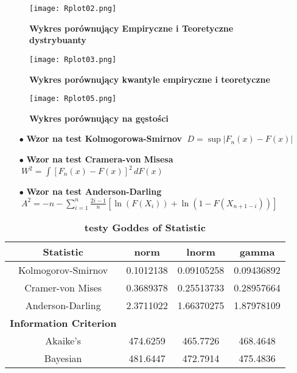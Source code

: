 \documentclass{article}
\begin{document}
\begin{figure}
    \centering
    \texttt{[image: Rplot02.png]}
    \caption{\textbf{Wykres porównujący Empiryczne i Teoretyczne dystrybuanty}}
    \label{fig:enter-label1}
\end{figure}

\begin{figure}
    \centering
    \texttt{[image: Rplot03.png]}
    \caption{\textbf{Wykres porównujący kwantyle empiryczne i teoretyczne}}
    \label{fig:enter-label2}
\end{figure}

\begin{figure}
    \centering
    \texttt{[image: Rplot05.png]}
    \caption{\textbf{Wykres porównujący na gęstości}}
    \label{fig:enter-label3}
\end{figure}
\vspace{12pt}

\begin{itemize}
    \item[$\bullet$] \textbf{Wzor na test Kolmogorowa-Smirnov $\ D = \sup|F_n(x) - F(x)|$}

    \item[$\bullet$] \textbf{Wzor na test Cramera-von Misesa $\ W^2 = \int [F_n(x) - F(x)]^2 \, dF(x)$}

    \item[$\bullet$] \textbf{Wzor na test Anderson-Darling $\ A^2 = -n - \sum_{i=1}^{n} \frac{2i-1}{n} \left[ \ln(F(X_i)) + \ln(1 - F(X_{n+1-i})) \right]$}
\end{itemize}

\vspace{12pt}

\begin{table}[htbp]
    \centering
    \caption{\textbf{testy Goddes of Statistic}}
    \begin{tabular}{|c|c|c|c|}
        \hline
        \textbf{Statistic} & \textbf{norm} & \textbf{lnorm} & \textbf{gamma} \\
        \hline
        Kolmogorov-Smirnov & 0.1012138 & 0.09105258 & 0.09436892 \\
        Cramer-von Mises & 0.3689378 & 0.25513733 & 0.28957664 \\
        Anderson-Darling & 2.3711022 & 1.66370275 & 1.87978109 \\
        \hline
        \textbf{Information Criterion} & & & \\
        Akaike's & 474.6259 & 465.7726 & 468.4648 \\
        Bayesian & 481.6447 & 472.7914 & 475.4836 \\
        \hline
    \end{tabular}
    \label{tab:my-table}
\end{table}
\end{document}
